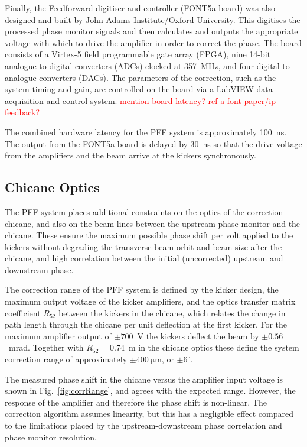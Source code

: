 \documentclass[%
 reprint,
superscriptaddress,
 amsmath,amssymb,
 prl,
]{revtex4-1}
\begin{document}
Finally, the Feedforward digitiser and controller (FONT5a board) 
\cite{RobertsThesis} was also 
designed and built by John Adams Institute/Oxford University. This digitises 
the 
processed phase monitor signals and then calculates and outputs the appropriate 
voltage with which to drive the amplifier in order to correct the phase. The 
board consists of a Virtex-5 field programmable gate array (FPGA), nine 14-bit 
analogue to digital converters (ADCs) clocked at 357~MHz, and four digital to 
analogue converters (DACs). The parameters of the correction, such as the 
system timing and gain, are controlled on the board via a LabVIEW data 
acquisition and control system. \textcolor{red}{mention board latency? ref a 
font paper/ip feedback?}

The combined hardware latency for the PFF system is approximately 100~ns. The 
output from the FONT5a board is delayed by 30~ns so that the drive voltage from 
the amplifiers and the beam arrive at the kickers synchronously.

\subsection{\label{ss:optics}Chicane Optics}

The PFF system places additional constraints on the optics of the correction 
chicane, and also on the beam lines between the upstream phase monitor and the 
chicane. These ensure the maximum possible phase shift per volt applied to the 
kickers without degrading the transverse beam orbit and beam size after the 
chicane, and high correlation between the initial (uncorrected) upstream and 
downstream phase.

The correction range of the PFF system is defined by the kicker design, the 
maximum output voltage of the kicker amplifiers, and the optics transfer matrix 
coefficient \(R_{52}\) between the kickers in the chicane, which relates the 
change in path length through the chicane per unit 
deflection at the first kicker. 
For the maximum amplifier output of \(\pm700\)~V the kickers deflect the beam 
by \(\pm0.56\)~mrad. Together with \(R_{52} = 0.74\)~m in the chicane optics 
these define the system correction range of approximately 
\(\pm400~\mathrm{\mu m}\), or \(\pm6^\circ\).

The measured phase shift in the chicane versus the amplifier input voltage is 
shown in Fig.~\ref{fig:corrRange}, and agrees with the expected range. 
However, the response of the amplifier and therefore the phase shift is 
non-linear. The correction algorithm assumes linearity, but this has a 
negligible effect compared to the limitations placed by the
upstream-downstream phase correlation and phase monitor resolution.
\end{document}
